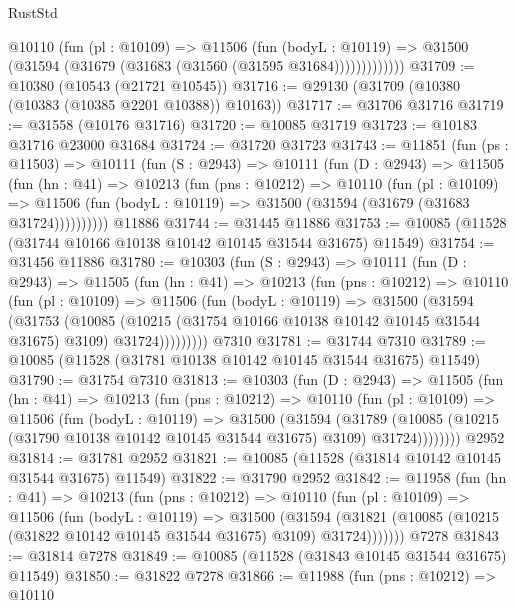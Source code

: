 \begin{lexlean}{RustStd}
\begin{coremodule}
              @10110
                (fun (pl : @10109) =>
                @11506
                  (fun (bodyL : @10119) =>
                  @31500 (@31594 (@31679 (@31683 (@31560 (@31595 @31684)))))))))))))
@31709 := @10380 (@10543 (@21721 @10545))
@31716 := @29130 (@31709 (@10380 (@10383 (@10385 @2201 @10388)) @10163))
@31717 := @31706 @31716
@31719 := @31558 (@10176 @31716)
@31720 := @10085 @31719
@31723 := @10183 @31716 @23000 @31684
@31724 := @31720 @31723
@31743 := @11851
    (fun (ps : @11503) =>
    @10111
      (fun (S : @2943) =>
      @10111
        (fun (D : @2943) =>
        @11505
          (fun (hn : @41) =>
          @10213
            (fun (pns : @10212) =>
            @10110
              (fun (pl : @10109) =>
              @11506 (fun (bodyL : @10119) => @31500 (@31594 (@31679 (@31683 @31724))))))))))
    @11886
@31744 := @31445 @11886
@31753 := @10085 (@11528 (@31744 @10166 @10138 @10142 @10145 @31544 @31675) @11549)
@31754 := @31456 @11886
@31780 := @10303
    (fun (S : @2943) =>
    @10111
      (fun (D : @2943) =>
      @11505
        (fun (hn : @41) =>
        @10213
          (fun (pns : @10212) =>
          @10110
            (fun (pl : @10109) =>
            @11506
              (fun (bodyL : @10119) =>
              @31500
                (@31594
                  (@31753
                    (@10085
                      (@10215 (@31754 @10166 @10138 @10142 @10145 @31544 @31675) @3109)
                      @31724)))))))))
    @7310
@31781 := @31744 @7310
@31789 := @10085 (@11528 (@31781 @10138 @10142 @10145 @31544 @31675) @11549)
@31790 := @31754 @7310
@31813 := @10303
    (fun (D : @2943) =>
    @11505
      (fun (hn : @41) =>
      @10213
        (fun (pns : @10212) =>
        @10110
          (fun (pl : @10109) =>
          @11506
            (fun (bodyL : @10119) =>
            @31500
              (@31594
                (@31789
                  (@10085 (@10215 (@31790 @10138 @10142 @10145 @31544 @31675) @3109) @31724))))))))
    @2952
@31814 := @31781 @2952
@31821 := @10085 (@11528 (@31814 @10142 @10145 @31544 @31675) @11549)
@31822 := @31790 @2952
@31842 := @11958
    (fun (hn : @41) =>
    @10213
      (fun (pns : @10212) =>
      @10110
        (fun (pl : @10109) =>
        @11506
          (fun (bodyL : @10119) =>
          @31500
            (@31594
              (@31821 (@10085 (@10215 (@31822 @10142 @10145 @31544 @31675) @3109) @31724)))))))
    @7278
@31843 := @31814 @7278
@31849 := @10085 (@11528 (@31843 @10145 @31544 @31675) @11549)
@31850 := @31822 @7278
@31866 := @11988
    (fun (pns : @10212) =>
    @10110

\end{coremodule}
\end{lexlean}
